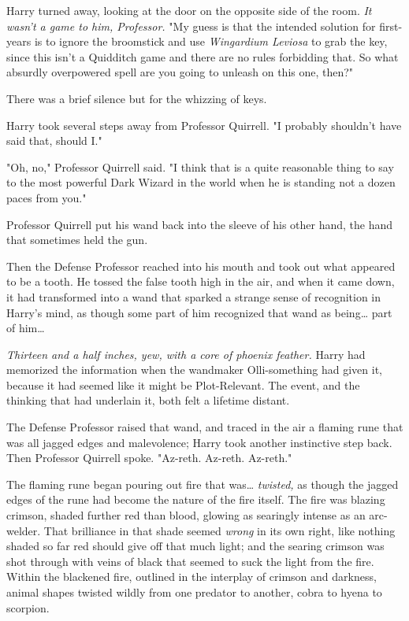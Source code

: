 Harry turned away, looking at the door on the opposite side of the room.
\emph{It wasn't a game to him, Professor.} "My guess is that the intended
solution for first-years is to ignore the broomstick and use \emph{Wingardium
Leviosa} to grab the key, since this isn't a Quidditch game and there are no
rules forbidding that. So what absurdly overpowered spell are you going to
unleash on this one, then?"

There was a brief silence but for the whizzing of keys.

Harry took several steps away from Professor Quirrell. "I probably shouldn't
have said that, should I."

"Oh, no," Professor Quirrell said. "I think that is a quite reasonable thing to
say to the most powerful Dark Wizard in the world when he is standing not a
dozen paces from you."

Professor Quirrell put his wand back into the sleeve of his other hand, the
hand that sometimes held the gun.

Then the Defense Professor reached into his mouth and took out what appeared to
be a tooth. He tossed the false tooth high in the air, and when it came down,
it had transformed into a wand that sparked a strange sense of recognition in
Harry's mind, as though some part of him recognized that wand as being{\ldots}
part of him{\ldots}

\emph{Thirteen and a half inches, yew, with a core of phoenix feather.} Harry
had memorized the information when the wandmaker Olli-something had given it,
because it had seemed like it might be Plot-Relevant. The event, and the
thinking that had underlain it, both felt a lifetime distant.

The Defense Professor raised that wand, and traced in the air a flaming rune
that was all jagged edges and malevolence; Harry took another instinctive step
back. Then Professor Quirrell spoke. "Az-reth. Az-reth. Az-reth."

The flaming rune began pouring out fire that was{\ldots} \emph{twisted,} as
though the jagged edges of the rune had become the nature of the fire itself.
The fire was blazing crimson, shaded further red than blood, glowing as
searingly intense as an arc-welder. That brilliance in that shade seemed
\emph{wrong} in its own right, like nothing shaded so far red should give off
that much light; and the searing crimson was shot through with veins of black
that seemed to suck the light from the fire. Within the blackened fire,
outlined in the interplay of crimson and darkness, animal shapes twisted wildly
from one predator to another, cobra to hyena to scorpion.

